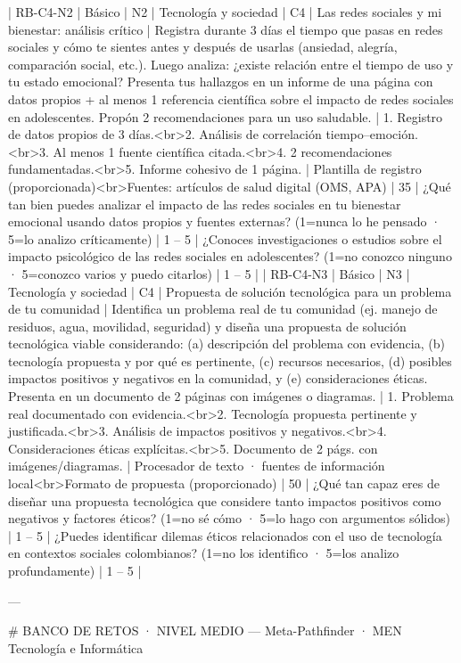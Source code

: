 | RB-C4-N2 | Básico | N2 | Tecnología y sociedad | C4 | Las redes sociales y mi bienestar: análisis crítico | Registra durante 3 días el tiempo que pasas en redes sociales y cómo te sientes antes y después de usarlas (ansiedad, alegría, comparación social, etc.). Luego analiza: ¿existe relación entre el tiempo de uso y tu estado emocional? Presenta tus hallazgos en un informe de una página con datos propios + al menos 1 referencia científica sobre el impacto de redes sociales en adolescentes. Propón 2 recomendaciones para un uso saludable. | 1. Registro de datos propios de 3 días.<br>2. Análisis de correlación tiempo–emoción.<br>3. Al menos 1 fuente científica citada.<br>4. 2 recomendaciones fundamentadas.<br>5. Informe cohesivo de 1 página. | Plantilla de registro (proporcionada)<br>Fuentes: artículos de salud digital (OMS, APA) | 35 | ¿Qué tan bien puedes analizar el impacto de las redes sociales en tu bienestar emocional usando datos propios y fuentes externas? (1=nunca lo he pensado · 5=lo analizo críticamente) | 1 – 5 | ¿Conoces investigaciones o estudios sobre el impacto psicológico de las redes sociales en adolescentes? (1=no conozco ninguno · 5=conozco varios y puedo citarlos) | 1 – 5 |
| RB-C4-N3 | Básico | N3 | Tecnología y sociedad | C4 | Propuesta de solución tecnológica para un problema de tu comunidad | Identifica un problema real de tu comunidad (ej. manejo de residuos, agua, movilidad, seguridad) y diseña una propuesta de solución tecnológica viable considerando: (a) descripción del problema con evidencia, (b) tecnología propuesta y por qué es pertinente, (c) recursos necesarios, (d) posibles impactos positivos y negativos en la comunidad, y (e) consideraciones éticas. Presenta en un documento de 2 páginas con imágenes o diagramas. | 1. Problema real documentado con evidencia.<br>2. Tecnología propuesta pertinente y justificada.<br>3. Análisis de impactos positivos y negativos.<br>4. Consideraciones éticas explícitas.<br>5. Documento de 2 págs. con imágenes/diagramas. | Procesador de texto · fuentes de información local<br>Formato de propuesta (proporcionado) | 50 | ¿Qué tan capaz eres de diseñar una propuesta tecnológica que considere tanto impactos positivos como negativos y factores éticos? (1=no sé cómo · 5=lo hago con argumentos sólidos) | 1 – 5 | ¿Puedes identificar dilemas éticos relacionados con el uso de tecnología en contextos sociales colombianos? (1=no los identifico · 5=los analizo profundamente) | 1 – 5 |

---

# BANCO DE RETOS · NIVEL MEDIO — Meta-Pathfinder · MEN Tecnología e Informática


